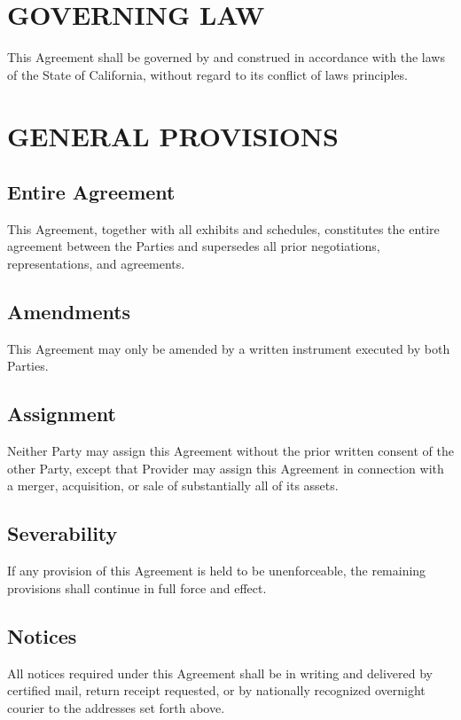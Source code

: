 \documentclass[
    language=english,
    doctype=contract,
    institution=none,
]{../../omnilatex}
\begin{document}
\section{GOVERNING LAW}

This Agreement shall be governed by and construed in accordance with the laws of the State of California, without regard to its conflict of laws principles.

\section{GENERAL PROVISIONS}

\subsection{Entire Agreement}
This Agreement, together with all exhibits and schedules, constitutes the entire agreement between the Parties and supersedes all prior negotiations, representations, and agreements.

\subsection{Amendments}
This Agreement may only be amended by a written instrument executed by both Parties.

\subsection{Assignment}
Neither Party may assign this Agreement without the prior written consent of the other Party, except that Provider may assign this Agreement in connection with a merger, acquisition, or sale of substantially all of its assets.

\subsection{Severability}
If any provision of this Agreement is held to be unenforceable, the remaining provisions shall continue in full force and effect.

\subsection{Notices}
All notices required under this Agreement shall be in writing and delivered by certified mail, return receipt requested, or by nationally recognized overnight courier to the addresses set forth above.
\end{document}
